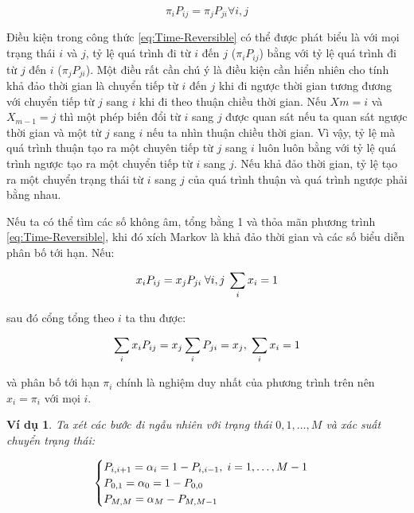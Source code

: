 \documentclass[14pt, a4paper]{article}
\numberwithin{equation}{section}
\numberwithin{figure}{section}
\theoremstyle{sltheorem}
\newtheorem{vd}{Ví dụ}
\theoremstyle{soltheorem}
\numberwithin{dl}{section}
\numberwithin{md}{section}
\numberwithin{vd}{section}
\begin{document}
    \begin{equation} \label{eq:Time-Reversible}
        \pi_i P_{ij} = \pi_j P_{ji} \forall i, j
    \end{equation}

    Điều kiện trong công thức \ref{eq:Time-Reversible} có thể được phát biểu là với mọi trạng thái $i$ và $j$, tỷ lệ quá trình đi từ $i$ đến $j$ ($\pi_i P_{ij}$) bằng với tỷ lệ quá trình đi từ $j$ đến $i$ ($\pi_j P_{ji}$).
    Một điều rất cần chú ý là điều kiện cần hiển nhiên cho tính khả đảo thời gian là chuyển tiếp từ $i$ đến $j$ khi đi ngược thời gian tương đương với chuyển tiếp từ $j$ sang $i$ khi đi theo thuận chiều thời gian.
    Nếu $Xm=i$ và $X_{m-1}=j$ thì một phép biến đổi từ $i$ sang $j$ được quan sát nếu ta quan sát ngược thời gian và một từ $j$ sang $i$ nếu ta nhìn thuận chiều thời gian.
    Vì vậy, tỷ lệ mà quá trình thuận tạo ra một chuyên tiếp từ $j$ sang $i$ luôn luôn bằng với tỷ lệ quá trình ngược tạo ra một chuyển tiếp từ $i$ sang $j$.
    Nếu khả đảo thời gian, tỷ lệ tạo ra một chuyển trạng thái từ $i$ sang $j$ của quá trình thuận và quá trình ngược phải bằng nhau.

    Nếu ta có thể tìm các số không âm, tổng bằng 1 và thỏa mãn phương trình \ref{eq:Time-Reversible}, khi đó xích Markov là khả đảo thời gian và các số biểu diễn phân bố tới hạn. Nếu:

    \begin{equation}
        x_i P_{ij} = x_j P_{ji} \thickspace \forall i, j \thickspace \sum_{i} x_i = 1
    \end{equation}

    sau đó cổng tổng theo $i$ ta thu được:

    \begin{equation*}
        \sum_i x_i P_{ij} = x_j \sum_i P_{ji} = x_j, \thickspace \sum_{i} x_i = 1
    \end{equation*}

    và phân bố tới hạn $\pi_i$ chính là nghiệm duy nhất của phương trình trên nên $x_i = \pi_i$ với mọi $i$.

    \begin{vd} \label{vd:4.35}
        Ta xét các bước đi ngẫu nhiên với trạng thái $0, 1, \dots, M$ và xác suất chuyển trạng thái:

        \begin{equation*}
            \begin{cases}
                P_{i, i+1} = \alpha_i = 1 - P_{i, i - 1}, \thickspace i=1, \dots, M-1 \\
                P_{0, 1} = \alpha_0 = 1 - P_{0, 0} \\
                P_{M,M} = \alpha_M - P_{M, M-1}
            \end{cases}
        \end{equation*}
    \end{vd}
\end{document}
